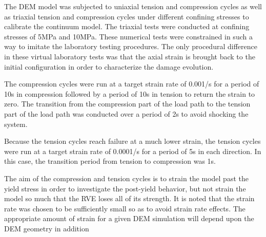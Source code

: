The DEM model was subjected to uniaxial tension and compression cycles
as well as triaxial tension and compression cycles under different
confining stresses to calibrate the continuum model. The triaxial
tests were conducted at confining stresses of 5MPa and 10MPa. These
numerical tests were constrained in such a way to imitate the laboratory
testing procedures. The only procedural difference in these virtual
laboratory tests was that the axial strain is brought back to the
initial configuration in order to characterize the damage evolution.

The compression cycles were run at a target strain rate of 0.001/s
for a period of 10s in compression followed by a period of 10s in
tension to return the strain to zero. The transition from the compression
part of the load path to the tension part of the load path was conducted
over a period of 2s to avoid shocking the system.

Because the tension cycles reach failure at a much lower strain, the
tension cycles were run at a target strain rate of 0.0001/s for a
period of 5s in each direction. In this case, the transition period
from tension to compression was 1s.

The aim of the compression and tension cycles is to strain the model
past the yield stress in order to investigate the post-yield behavior,
but not strain the model so much that the RVE loses all of its strength.
It is noted that the strain rate was chosen to be sufficiently small
so as to avoid strain rate effects. The appropriate amount of strain
for a given DEM simulation will depend upon the DEM geometry in addition
